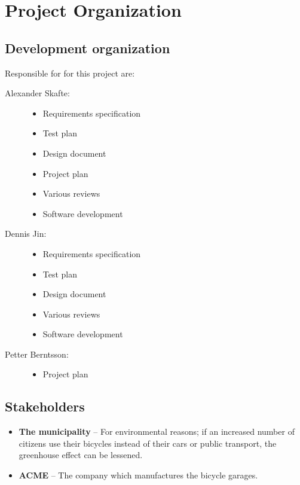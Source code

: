 \documentclass[12pt,titlepage]{article}
\begin{document}
\section{Project Organization}

\subsection{Development organization}

Responsible for for this project are:

\begin{description}
	\item[Alexander Skafte:] \hfill
		\begin{itemize}
			\item Requirements specification
			\item Test plan
			\item Design document
			\item Project plan
			\item Various reviews
			\item Software development
		\end{itemize}
	\item[Dennis Jin:] \hfill
		\begin{itemize}
			\item Requirements specification
			\item Test plan
			\item Design document
			\item Various reviews
			\item Software development
		\end{itemize}
	\item[Petter Berntsson:] \hfill
		\begin{itemize}
			\item Project plan
		\end{itemize}
\end{description}

\subsection{Stakeholders}

\begin{itemize}
	\item \textbf{The municipality} -- For environmental reasons; if an
		increased number of citizens use their bicycles instead of their
		cars or public transport, the greenhouse effect can be lessened.
	\item \textbf{ACME} -- The company which manufactures the bicycle
		garages.
\end{itemize}
\end{document}
